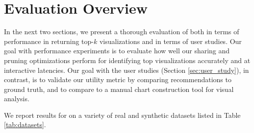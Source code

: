 \section{Evaluation Overview}
\label{sec:experiments_overview}
 
In the next two sections, we present a thorough evaluation of \SeeDB both in terms
of performance in returning top-$k$ visualizations and in terms of user 
studies.
Our goal with performance experiments is to evaluate how well our sharing and pruning
optimizations perform for identifying top visualizations accurately and at interactive
latencies.
Our goal with the user studies (Section \ref{sec:user_study}), in contrast, is to validate 
our utility metric by comparing \SeeDB recommendations to ground truth, and to compare 
\SeeDB to a manual chart construction tool for visual analysis.

We report results for \SeeDB on a variety of real and synthetic datasets listed in Table 
\ref{tab:datasets}.

